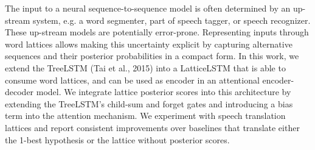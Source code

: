 The input to a neural sequence-to-sequence model is often determined by an up-stream system, e.g. a word segmenter, part of speech tagger, or speech recognizer. These up-stream models are potentially error-prone. Representing inputs through word lattices allows making this uncertainty explicit by capturing alternative sequences and their posterior probabilities in a compact form. In this work, we extend the TreeLSTM (Tai et al., 2015) into a LatticeLSTM that is able to consume word lattices, and can be used as encoder in an attentional encoder-decoder model. We integrate lattice posterior scores into this architecture by extending the TreeLSTM's child-sum and forget gates and introducing a bias term into the attention mechanism. We experiment with speech translation lattices and report consistent improvements over baselines that translate either the 1-best hypothesis or the lattice without posterior scores.

